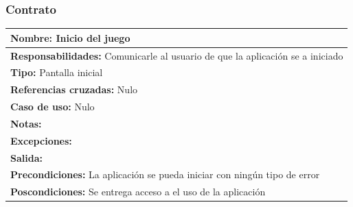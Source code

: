 \subsubsection{Contrato}
\begin{table}[H]
    \begin{center}
        \begin{tabular}{| m{15cm} |}       
        	\hline 
        	\textbf{Nombre:} Inicio del juego \\
        	\hline
        	\textbf{Responsabilidades:} Comunicarle al usuario de que la aplicación se a iniciado\\
        	\hline
        	\textbf{Tipo:} Pantalla inicial \\
        	\hline
        	\textbf{Referencias cruzadas:} Nulo\\
        	\hline
        	\textbf{Caso de uso:} Nulo\\
        	\hline
        	\textbf{Notas:} \\
        	\hline
        	\textbf{Excepciones:} \\
        	\hline
        	\textbf{Salida:} \\
        	\hline
        	\textbf{Precondiciones:} La aplicación se pueda iniciar con ningún tipo de error\\
        	\hline
        	\textbf{Poscondiciones:} Se entrega acceso a el uso de la aplicación\\
        	\hline
        \end{tabular}
    \end{center}
\end{table}

